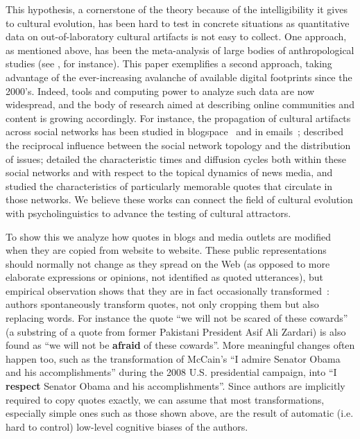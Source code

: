 \begin{new}
This hypothesis, a cornerstone of the theory because of the intelligibility it gives to cultural evolution, has been hard to test in concrete situations as quantitative data on out-of-laboratory cultural artifacts is not easy to collect.
One approach, as mentioned above, has been the meta-analysis of large bodies of anthropological studies (see \citealp{miton_universal_2015}, for instance).
This paper exemplifies a second approach, taking advantage of the ever-increasing avalanche of available digital footprints since the 2000's.
Indeed, tools and computing power to analyze such data are now widespread, and the body of research aimed at describing online communities and content is growing accordingly.
For instance, the propagation of cultural artifacts across social networks has been studied in blogspace~\citep{gruhl_information_2004} and in emails~\citep{liben-nowell_tracing_2008};
\citet{cointet_socio-semantic_2009} described the reciprocal influence between the social network topology and the distribution of issues;
\citet{leskovec_meme-tracking_2009} detailed the characteristic times and diffusion cycles both within these social networks and with respect to the topical dynamics of news media, and \citet{danescu-niculescu-mizil_you_2012} studied the characteristics of particularly memorable quotes that circulate in those networks.
We believe these works can connect the field of cultural evolution with psycholinguistics to advance the testing of cultural attractors.

\bigskip

To show this we analyze how quotes in blogs and media outlets are modified when they are copied from website to website.
These public representations should normally not change as they spread on the Web (as opposed to more elaborate expressions or opinions, not identified as quoted utterances), but empirical observation shows that they are in fact occasionally transformed~\citep{simmons_memes_2011}:
authors spontaneously transform quotes, not only cropping them but also replacing words.
For instance the quote ``we will not be scared of these cowards'' (a substring of a quote from former Pakistani President Asif Ali Zardari) is also found as ``we will not be \textbf{afraid} of these cowards''.
More meaningful changes often happen too, such as the transformation of McCain's ``I admire Senator Obama and his accomplishments'' during the 2008 U.S. presidential campaign, into ``I \textbf{respect} Senator Obama and his accomplishments''.
Since authors are implicitly required to copy quotes exactly, we can assume that most transformations, especially simple ones such as those shown above, are the result of automatic (\hbox{i.e.} hard to control) low-level cognitive biases of the authors.


\end{new}
